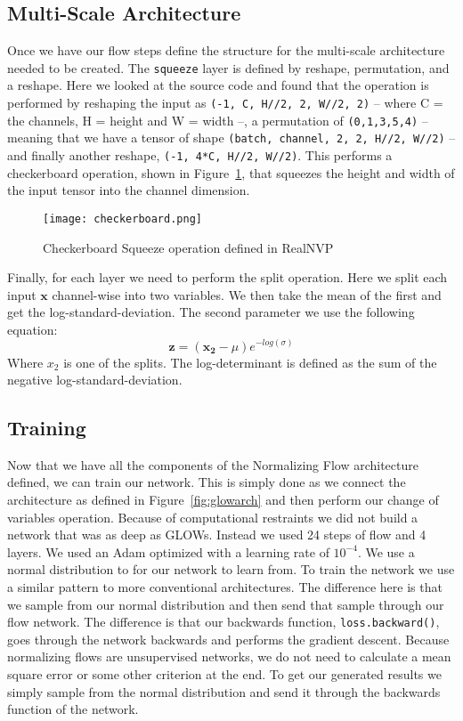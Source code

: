 \subsection{Multi-Scale Architecture}
Once we have our flow steps define the structure for the multi-scale
architecture needed to be created. The \lstinline[basicstyle=\ttfamily]|squeeze|
layer is defined by reshape, permutation, and a reshape. Here we looked at the
source code and found that the operation is performed by reshaping the input as
\lstinline[basicstyle=\ttfamily]|(-1, C, H//2, 2, W//2, 2)| -- where C = the channels, H =
height and W = width --, a permutation of \lstinline[basicstyle=\ttfamily]|(0,1,3,5,4)| --
meaning that we have a tensor of shape 
\lstinline[basicstyle=\ttfamily]|(batch, channel, 2, 2, H//2, W//2)| 
-- and finally another reshape,
\lstinline[basicstyle=\ttfamily]|(-1, 4*C, H//2, W//2)|. This performs a checkerboard
operation, shown in Figure~\ref{fig:checkerboard}, that squeezes the height and
width of the input tensor into the channel dimension.
%
\begin{figure}
\center\texttt{[image: checkerboard.png]}
\caption{Checkerboard Squeeze operation defined in RealNVP}
\label{fig:checkerboard}
\end{figure}
%
Finally, for each layer we need to perform the split operation. Here we split
each input $\mathbf{x}$ channel-wise into two variables. We then take the mean
of the first and get the log-standard-deviation. The second parameter we use the
following equation:
%
\begin{equation}
    \mathbf{z} = (\mathbf{x_2} - \mu)e^{-log(\sigma)}
\end{equation}
%
Where $x_2$ is one of the splits. The log-determinant is defined as the sum of
the negative log-standard-deviation. 

\subsection{Training}
%
Now that we have all the components of the Normalizing Flow architecture
defined, we can train our network. This is simply done as we connect the
architecture as defined in Figure~\ref{fig:glowarch} and then perform our change
of variables operation. Because of computational restraints we did not build a
network that was as deep as GLOWs. Instead we used 24 steps of flow and 4
layers. We used an Adam optimized with a learning rate of $10^{-4}$. We use a
normal distribution to for our network to learn from. To train the network we
use a similar pattern to more conventional architectures. The difference here is
that we sample from our normal distribution and then send that sample through
our flow network. The difference is that our backwards function,
\lstinline[basicstyle=\ttfamily]|loss.backward()|, goes through the network
backwards and performs the gradient descent. Because normalizing flows are
unsupervised networks, we do not need to calculate a mean square error or some
other criterion at the end. To get our generated results we simply sample from
the normal distribution and send it through the backwards function of the
network. 
